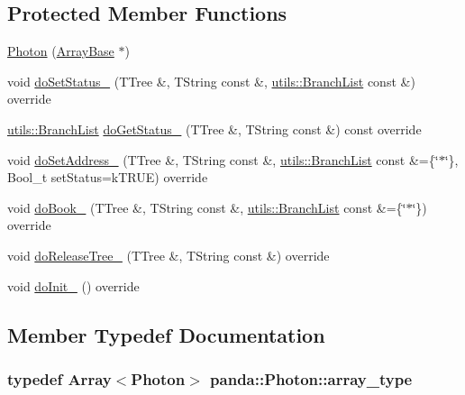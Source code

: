 \subsection*{Protected Member Functions}
\begin{DoxyCompactItemize}
\item 
\hyperlink{classpanda_1_1Photon_a0f96aaa96ea64de858f98605985eaa3c}{Photon} (\hyperlink{classpanda_1_1ArrayBase}{ArrayBase} $\ast$)
\item 
void \hyperlink{classpanda_1_1Photon_a8fbe4f60488cc95024bd4a50b6df6b95}{doSetStatus\_\-} (TTree \&, TString const \&, \hyperlink{classpanda_1_1utils_1_1BranchList}{utils::BranchList} const \&) override
\item 
\hyperlink{classpanda_1_1utils_1_1BranchList}{utils::BranchList} \hyperlink{classpanda_1_1Photon_ae0b07f281f6553d7d1fe088374e6e39b}{doGetStatus\_\-} (TTree \&, TString const \&) const override
\item 
void \hyperlink{classpanda_1_1Photon_a9a8788ec145f035a7a2875d5a7f9ef98}{doSetAddress\_\-} (TTree \&, TString const \&, \hyperlink{classpanda_1_1utils_1_1BranchList}{utils::BranchList} const \&=\{\char`\"{}$\ast$\char`\"{}\}, Bool\_\-t setStatus=kTRUE) override
\item 
void \hyperlink{classpanda_1_1Photon_aaa6770e70a128a4e4910899f92fbd816}{doBook\_\-} (TTree \&, TString const \&, \hyperlink{classpanda_1_1utils_1_1BranchList}{utils::BranchList} const \&=\{\char`\"{}$\ast$\char`\"{}\}) override
\item 
void \hyperlink{classpanda_1_1Photon_a316d874232548d46d8ce0452b1d0fda9}{doReleaseTree\_\-} (TTree \&, TString const \&) override
\item 
void \hyperlink{classpanda_1_1Photon_a445fd29d5ce7a07c93443c05ae830a72}{doInit\_\-} () override
\end{DoxyCompactItemize}


\subsection{Member Typedef Documentation}
\hypertarget{classpanda_1_1Photon_aae6023205ea85eb74f4870f012b302ce}{
\subsubsection[{array\_\-type}]{\setlength{\rightskip}{0pt plus 5cm}typedef {\bf Array}$<${\bf Photon}$>$ {\bf panda::Photon::array\_\-type}}}
\label{classpanda_1_1Photon_aae6023205ea85eb74f4870f012b302ce}


